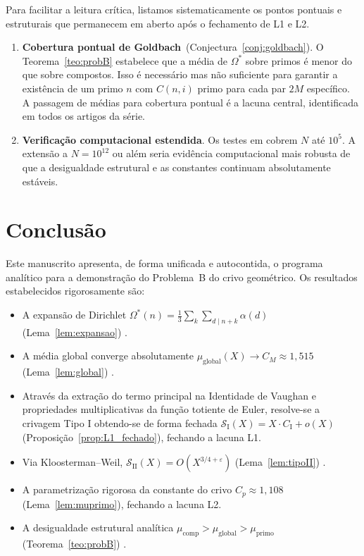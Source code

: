\documentclass[12pt]{article}
\theoremstyle{definition}
\theoremstyle{remark}
\newcommand{\Omstar}{\Omega^*}
\newcommand{\SI}{\mathcal{S}_{\mathrm{I}}}
\newcommand{\SII}{\mathcal{S}_{\mathrm{II}}}
\newcommand{\muglobal}{\mu_{\mathrm{global}}}
\newcommand{\muprimo}{\mu_{\mathrm{primo}}}
\newcommand{\mucomp}{\mu_{\mathrm{comp}}}
\begin{document}
	Para facilitar a leitura crítica, listamos sistematicamente os pontos pontuais e estruturais que permanecem em aberto após o fechamento de L1 e L2.
	
	\begin{enumerate}[label=\textbf{L\arabic*.}]
		
		\item \textbf{Cobertura pontual de Goldbach}~(Conjectura~\ref{conj:goldbach}).
		O Teorema~\ref{teo:probB} estabelece que a média de $\Omstar$ sobre
		primos é menor do que sobre compostos.
		Isso é necessário mas não suficiente para garantir a existência de um primo $n$ com $C(n,i)$
		primo para cada par $2M$ específico.
		A passagem de médias para cobertura pontual é a lacuna central, identificada em todos os
		artigos da série.
		
		\item \textbf{Verificação computacional estendida}.
		Os testes em \cite{bandeira3} cobrem $N$ até $10^5$. A extensão a $N=10^{12}$ ou
		além seria evidência computacional mais robusta de que a desigualdade
		estrutural e as constantes continuam absolutamente estáveis.
	\end{enumerate}
	
	\section{Conclusão}
	\label{sec:conclusao}
	
	Este manuscrito apresenta, de forma unificada e autocontida, o programa
	analítico para a demonstração do Problema~B do crivo geométrico.
	Os resultados estabelecidos rigorosamente são:
	
	\begin{itemize}
		\item A expansão de Dirichlet $\Omstar(n)=\frac{1}{3}\sum_k\sum_{d\mid n+k}\alpha(d)$
		(Lema~\ref{lem:expansao}) .
		\item A média global converge absolutamente $\muglobal(X) \to C_M \approx 1{,}515$
		(Lema~\ref{lem:global}) .
		\item Através da extração do termo principal na Identidade de Vaughan e propriedades multiplicativas da função totiente de Euler, resolve-se a crivagem Tipo I obtendo-se de forma fechada $\SI(X) = X \cdot C_{\mathrm{I}} + o(X)$ (Proposição~\ref{prop:L1_fechado}), fechando a lacuna L1.
		\item Via Kloosterman–Weil, $\SII(X)=O(X^{3/4+\varepsilon})$
		(Lema~\ref{lem:tipoII}) .
		\item A parametrização rigorosa da constante do crivo $C_p \approx 1{,}108$ (Lema~\ref{lem:muprimo}), fechando a lacuna L2.
		\item A desigualdade estrutural analítica $\mucomp>\muglobal>\muprimo$
		(Teorema~\ref{teo:probB}) .
	\end{itemize}
	
\end{document}
